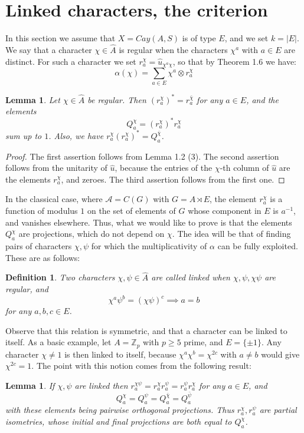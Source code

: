 \documentclass[11pt]{amsart}
\newtheorem{lemma}[theorem]{Lemma}
\newtheorem{definition}[theorem]{Definition}
\newcommand{\A}{\mathcal A}
\newcommand{\Z}{\mathbb Z}
\newcommand{\hA}{\widehat A}
\newcommand{\hu}{\widehat u}
\newcommand{\bchi}{\bar\chi}
\newcommand{\bpsi}{\bar\psi}
\begin{document}
\section{Linked characters, the criterion}

In this section we assume that $X=Cay(A,S)$ is of type $E$, and we set $k=|E|$. We say that a character $\chi\in\hA$ is regular when the characters $\chi^a$ with $a\in E$ are distinct. For such a character we set $r^\chi_a=\hu_{\chi^a\chi}$, so that by Theorem 1.6 we have:
$$\alpha(\chi)=\sum_{a\in E}\chi^a\otimes r^\chi_a$$

\begin{lemma}
Let $\chi\in\hA$ be regular. Then $(r^\chi_a)^*=r^{\bchi}_a$ for any $a\in E$, and the elements
$$Q^\chi_a=(r^\chi_a)^*r^\chi_a$$
sum up to $1$. Also, we have $r^\chi_a(r^\chi_a)^*=Q^{\bchi}_a$.
\end{lemma}

\begin{proof}
The first assertion follows from Lemma 1.2 (3). The second assertion follows from the unitarity of $\hu$, because the entries of the $\chi$-th column of $\hu$ are the elements $r^\chi_a$, and zeroes. The third assertion follows from the first one.
\end{proof}

In the classical case, where $\A=C(G)$ with $G=A\rtimes E$, the element $r^\chi_a$ is a function of modulus $1$ on the set of elements of $G$ whose component in $E$ is $a^{-1}$, and vanishes elsewhere. Thus, what we would like to prove is that the elements $Q^\chi_a$ are projections, which do not depend on $\chi$. The idea will be that of finding pairs of characters $\chi,\psi$ for which the multiplicativity of $\alpha$ can be fully exploited. These are as follows:

\begin{definition}
Two characters $\chi,\psi\in\hA$ are called linked when $\chi,\psi,\chi\psi$ are regular, and
$$\chi^a\psi^b=(\chi\psi)^c\implies a=b$$
for any $a,b,c\in E$.
\end{definition}

Observe that this relation is symmetric, and that a character can be linked to itself. As a basic example, let $A=\Z_p$ with $p\geq5$ prime, and $E=\{\pm1\}$. Any character $\chi\neq1$ is then linked to itself, because $\chi^a\chi^b=\chi^{2c}$ with $a\neq b$ would give $\chi^{2c}=1$. The point with this notion comes from the following result:

\begin{lemma}
If $\chi,\psi$ are linked then $r^{\chi\psi}_a=r^\chi_ar^\psi_a=r^\psi_ar^\chi_a$ for any $a\in E$, and
$$Q^\chi_a=Q^\psi_a=Q^{\bchi}_a=Q^{\bpsi}_a$$
with these elements being pairwise orthogonal projections. Thus $r^\chi_a,r^\psi_a$ are partial isometries, whose initial and final projections are both equal to $Q^\chi_a$.
\end{lemma}
\end{document}
